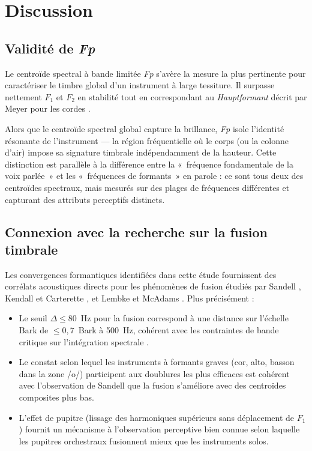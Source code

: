 \documentclass[12pt,a4paper]{article}
\begin{document}
\section{Discussion}

\subsection{Validité de \textit{Fp}}

Le centroïde spectral à bande limitée \textit{Fp} s'avère la mesure la plus pertinente
pour caractériser le timbre global d'un instrument à large tessiture. Il surpasse
nettement $F_1$ et $F_2$ en stabilité tout en correspondant au \emph{Hauptformant}
décrit par Meyer pour les cordes \citep{Meyer2009}.

Alors que le centroïde spectral global \citep{Peeters2011} capture la brillance,
\textit{Fp} isole l'identité résonante de l'instrument --- la région fréquentielle
où le corps (ou la colonne d'air) impose sa signature timbrale indépendamment de la
hauteur. Cette distinction est parallèle à la différence entre la «~fréquence
fondamentale de la voix parlée~» et les «~fréquences de formants~» en parole : ce
sont tous deux des centroïdes spectraux, mais mesurés sur des plages de fréquences
différentes et capturant des attributs perceptifs distincts.

\subsection{Connexion avec la recherche sur la fusion timbrale}

Les convergences formantiques identifiées dans cette étude fournissent des corrélats
acoustiques directs pour les phénomènes de fusion étudiés par Sandell \citep{Sandell1995},
Kendall et Carterette \citep{Kendall1993}, et Lembke et McAdams \citep{Lembke2017}.
Plus précisément :

\begin{itemize}
\item Le seuil $\Delta \leq 80$~Hz pour la fusion correspond à une distance sur
l'échelle Bark de $\leq 0,7$~Bark à 500~Hz, cohérent avec les contraintes de bande
critique sur l'intégration spectrale \citep{Zwicker1961}.

\item Le constat selon lequel les instruments à formants graves (cor, alto, basson dans
la zone /o/) participent aux doublures les plus efficaces est cohérent avec
l'observation de Sandell que la fusion s'améliore avec des centroïdes composites plus bas.

\item L'effet de pupitre (lissage des harmoniques supérieurs sans déplacement de $F_1$)
fournit un mécanisme à l'observation perceptive bien connue selon laquelle les pupitres
orchestraux fusionnent mieux que les instruments solos.
\end{itemize}
\end{document}
